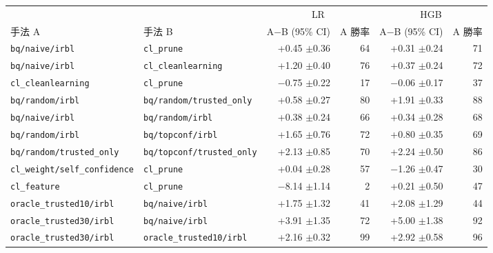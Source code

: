 \begin{tabular}{llrrrr}
\toprule
 & & \multicolumn{2}{c}{LR} & \multicolumn{2}{c}{HGB} \\
\cmidrule(lr){3-4} \cmidrule(lr){5-6}
手法 A & 手法 B & A$-$B (95\% CI) & A 勝率 & A$-$B (95\% CI) & A 勝率 \\
\midrule
\texttt{bq/naive/irbl} & \texttt{cl\_prune} & +0.45 {\scriptsize$\pm$0.36} & 64 & +0.31 {\scriptsize$\pm$0.24} & 71 \\
\texttt{bq/naive/irbl} & \texttt{cl\_cleanlearning} & +1.20 {\scriptsize$\pm$0.40} & 76 & +0.37 {\scriptsize$\pm$0.24} & 72 \\
\texttt{cl\_cleanlearning} & \texttt{cl\_prune} & $-$0.75 {\scriptsize$\pm$0.22} & 17 & $-$0.06 {\scriptsize$\pm$0.17} & 37 \\
\texttt{bq/random/irbl} & \texttt{bq/random/trusted\_only} & +0.58 {\scriptsize$\pm$0.27} & 80 & +1.91 {\scriptsize$\pm$0.33} & 88 \\
\texttt{bq/naive/irbl} & \texttt{bq/random/irbl} & +0.38 {\scriptsize$\pm$0.24} & 66 & +0.34 {\scriptsize$\pm$0.28} & 68 \\
\texttt{bq/random/irbl} & \texttt{bq/topconf/irbl} & +1.65 {\scriptsize$\pm$0.76} & 72 & +0.80 {\scriptsize$\pm$0.35} & 69 \\
\texttt{bq/random/trusted\_only} & \texttt{bq/topconf/trusted\_only} & +2.13 {\scriptsize$\pm$0.85} & 70 & +2.24 {\scriptsize$\pm$0.50} & 86 \\
\texttt{cl\_weight/self\_confidence} & \texttt{cl\_prune} & +0.04 {\scriptsize$\pm$0.28} & 57 & $-$1.26 {\scriptsize$\pm$0.47} & 30 \\
\texttt{cl\_feature} & \texttt{cl\_prune} & $-$8.14 {\scriptsize$\pm$1.14} & 2 & +0.21 {\scriptsize$\pm$0.50} & 47 \\
\texttt{oracle\_trusted10/irbl} & \texttt{bq/naive/irbl} & +1.75 {\scriptsize$\pm$1.32} & 41 & +2.08 {\scriptsize$\pm$1.29} & 44 \\
\texttt{oracle\_trusted30/irbl} & \texttt{bq/naive/irbl} & +3.91 {\scriptsize$\pm$1.35} & 72 & +5.00 {\scriptsize$\pm$1.38} & 92 \\
\texttt{oracle\_trusted30/irbl} & \texttt{oracle\_trusted10/irbl} & +2.16 {\scriptsize$\pm$0.32} & 99 & +2.92 {\scriptsize$\pm$0.58} & 96 \\
\bottomrule
\end{tabular}
